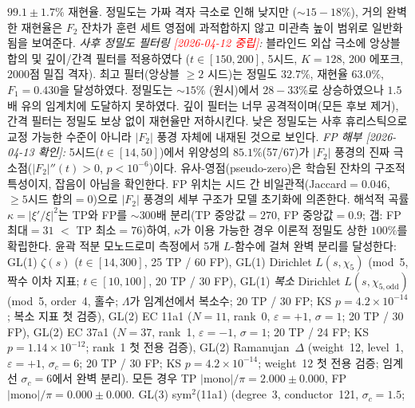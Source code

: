 \documentclass[11pt, a4paper]{article}
\theoremstyle{definition}
\theoremstyle{plain}
\newcommand{\xif}{\xi}
\begin{document}
\begin{itemize}
        $99.1\pm1.7\%$ 재현율. 정밀도는 가짜 격자 극소로 인해
        낮지만 ($\sim\!15{-}18\%$), 거의 완벽한 재현율은 $F_2$
        잔차가 훈련 세트 영점에 과적합하지 않고 미관측 높이
        범위로 일반화됨을 보여준다.
        \emph{사후 정밀도 필터링
        \textcolor{red}{[2026-04-12 중립]}:}
        블라인드 외삽 극소에 앙상블 합의 및 깊이/간격 필터를 적용하였다
        ($t\in[150,200]$, 5시드, $K=128$, 200 에포크, 2000점 밀집 격자).
        최고 필터(앙상블 $\ge 2$ 시드)는 정밀도 $32.7\%$,
        재현율 $63.0\%$, $F_1=0.430$을 달성하였다.
        정밀도는 ${\sim}15\%$ (원시)에서 $28{-}33\%$로 상승하였으나
        $1.5$배 유의 임계치에 도달하지 못하였다.
        깊이 필터는 너무 공격적이며(모든 후보 제거), 간격 필터는
        정밀도 보상 없이 재현율만 저하시킨다.
        낮은 정밀도는 사후 휴리스틱으로 교정 가능한 수준이 아니라
        $|F_2|$ 풍경 자체에 내재된 것으로 보인다.
        \emph{FP 해부
        [2026-04-13 확인]:}
        5시드($t\in[14,50]$)에서 위양성의 $85.1\%$(57/67)가
        $|F_2|$ 풍경의 진짜 극소점($|F_2|''(t)>0$, $p<10^{-6}$)이다.
        유사-영점(pseudo-zero)은 학습된 잔차의 구조적 특성이지,
        잡음이 아님을 확인한다.
        FP 위치는 시드 간 비일관적(Jaccard${}=0.046$,
        $\ge\!5$시드 합의${}=0$)으로 $|F_2|$ 풍경의 세부 구조가
        모델 초기화에 의존한다.
        해석적 곡률 $\kappa=|\xif'/\xif|^2$는 TP와 FP를
        ${\sim}300$배 분리(TP 중앙값${}=270$, FP 중앙값${}=0.9$;
        갭: FP 최대${}=31$ $<$ TP 최소${}=76$)하여,
        $\kappa$가 이용 가능한 경우 이론적 정밀도 상한 $100\%$를
        확립한다. 윤곽 적분 모노드로미 측정에서 5개 $L$-함수에 걸쳐 완벽 분리를 달성한다:
        GL(1) $\zeta(s)$ ($t\in[14,300]$, 25 TP / 60 FP),
        GL(1) Dirichlet $L(s,\chi_5)$ (mod~5, 짝수 이차 지표;
        $t\in[10,100]$, 20 TP / 30 FP),
        GL(1) \emph{복소} Dirichlet $L(s,\chi_{5,\mathrm{odd}})$ (mod~5, order~4, 홀수;
        $\Lambda$가 임계선에서 복소수;
        20 TP / 30 FP; KS $p = 4.2 \times 10^{-14}$; 복소 지표 첫 검증),
        GL(2) EC 11a1 ($N=11$, rank~0, $\varepsilon=+1$, $\sigma=1$;
        20 TP / 30 FP),
        GL(2) EC 37a1 ($N=37$, rank~1, $\varepsilon=-1$, $\sigma=1$;
        20 TP / 24 FP; KS $p = 1.14 \times 10^{-12}$; rank~1 첫 전용 검증),
        GL(2) Ramanujan~$\Delta$ (weight~12, level~1, $\varepsilon=+1$, $\sigma_c=6$;
        20 TP / 30 FP; KS $p = 4.2 \times 10^{-14}$; weight~12 첫 전용 검증;
        임계선 $\sigma_c=6$에서 완벽 분리).
        모든 경우 TP $|\mathrm{mono}|/\pi = 2.000 \pm 0.000$,
        FP $|\mathrm{mono}|/\pi = 0.000 \pm 0.000$.
        GL(3) sym$^2$(11a1) (degree~3, conductor~121, $\sigma_c=1.5$;

\end{itemize}
\end{document}
